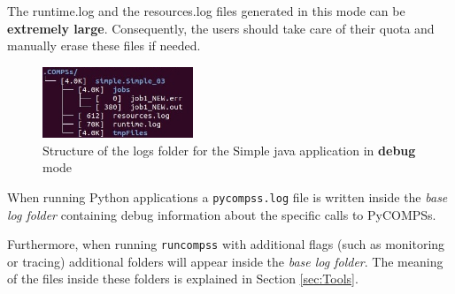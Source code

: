 The runtime.log and the resources.log files generated in this mode can be \textbf{extremely large}. Consequently, the users should
take care of their quota and manually erase these files if needed. \newline

\begin{figure}[h!]
  \centering
    \includegraphics[width=0.4\textwidth]{./Sections/3_Results_and_Logs/Figures/simple_log_debug.jpeg}
    \caption{Structure of the logs folder for the Simple java application in \textbf{debug} mode}
    \label{fig:simple_log_debug}
\end{figure}

When running Python applications a \texttt{pycompss.log} file is written inside the \textit{base log folder} containing debug
information about the specific calls to PyCOMPSs. 

Furthermore, when running \texttt{runcompss} with additional flags (such as monitoring or tracing) additional folders will appear inside the 
\textit{base log folder}. The meaning of the files inside these folders is explained in Section \ref{sec:Tools}. 
